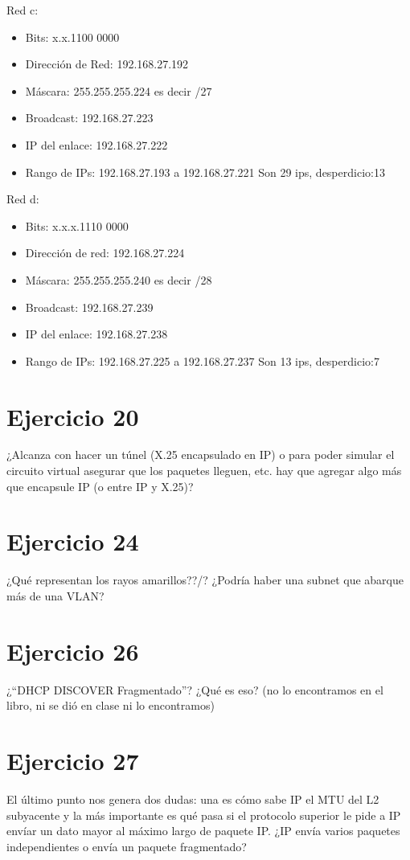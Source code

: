 \documentclass[a4paper,10pt]{article}
\begin{document}
Red c:
\begin{itemize}
	\item Bits: x.x.1100 0000
	\item Dirección de Red: 192.168.27.192
	\item Máscara: 255.255.255.224 es decir /27
	\item Broadcast: 192.168.27.223
	\item IP del enlace: 192.168.27.222
	\item Rango de IPs: 192.168.27.193 a 192.168.27.221 Son 29 ips, desperdicio:13
\end{itemize}


Red d:
\begin{itemize}
	\item Bits: x.x.x.1110 0000
	\item Dirección de red: 192.168.27.224
	\item Máscara: 255.255.255.240 es decir /28
	\item Broadcast: 192.168.27.239
	\item IP del enlace: 192.168.27.238
	\item Rango de IPs: 192.168.27.225 a 192.168.27.237 Son 13 ips, desperdicio:7
\end{itemize}

\section*{Ejercicio 20}
¿Alcanza con hacer un túnel (X.25 encapsulado en IP) o para poder simular el circuito virtual asegurar que los paquetes lleguen, etc. hay que agregar algo más que encapsule IP (o entre IP y X.25)?

\section*{Ejercicio 24}
¿Qué representan los rayos amarillos??/? ¿Podría haber una subnet que abarque más de una VLAN?

\section*{Ejercicio 26}
¿``DHCP DISCOVER Fragmentado''? ¿Qué es eso? (no lo encontramos en el libro, ni se dió en clase ni lo encontramos)

\section*{Ejercicio 27}
El último punto nos genera dos dudas: una es cómo sabe IP el MTU del L2 subyacente y la más importante es qué pasa si el protocolo superior le pide a IP envíar un dato mayor al máximo largo de paquete IP. ¿IP envía varios paquetes independientes o envía un paquete fragmentado?
\end{document}
